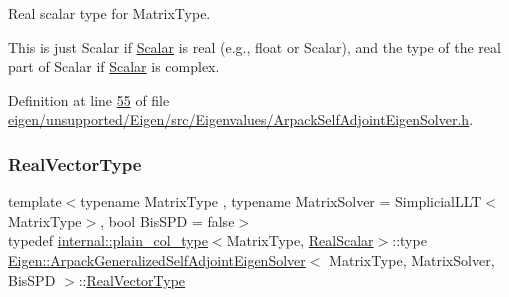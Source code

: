 Real scalar type for {\ttfamily Matrix\+Type}. 

This is just {\ttfamily Scalar} if \hyperlink{class_eigen_1_1_arpack_generalized_self_adjoint_eigen_solver_ab1182405bfe87a505d4b7a8311c661ec}{Scalar} is real (e.\+g., {\ttfamily float} or {\ttfamily Scalar}), and the type of the real part of {\ttfamily Scalar} if \hyperlink{class_eigen_1_1_arpack_generalized_self_adjoint_eigen_solver_ab1182405bfe87a505d4b7a8311c661ec}{Scalar} is complex. 

Definition at line \hyperlink{eigen_2unsupported_2_eigen_2src_2_eigenvalues_2_arpack_self_adjoint_eigen_solver_8h_source_l00055}{55} of file \hyperlink{eigen_2unsupported_2_eigen_2src_2_eigenvalues_2_arpack_self_adjoint_eigen_solver_8h_source}{eigen/unsupported/\+Eigen/src/\+Eigenvalues/\+Arpack\+Self\+Adjoint\+Eigen\+Solver.\+h}.

\mbox{\label{class_eigen_1_1_arpack_generalized_self_adjoint_eigen_solver_a47a5becb6dda25dbd90a1704a8247dd8}} 
\subsubsection{\texorpdfstring{Real\+Vector\+Type}{RealVectorType}\hspace{0.1cm}{\footnotesize\ttfamily [1/2]}}
{\footnotesize\ttfamily template$<$typename Matrix\+Type , typename Matrix\+Solver  = Simplicial\+L\+L\+T$<$\+Matrix\+Type$>$, bool Bis\+S\+PD = false$>$ \\
typedef \hyperlink{struct_eigen_1_1internal_1_1plain__col__type}{internal\+::plain\+\_\+col\+\_\+type}$<$Matrix\+Type, \hyperlink{class_eigen_1_1_arpack_generalized_self_adjoint_eigen_solver_a2555af55e53bf9de894a49e639be2e1e}{Real\+Scalar}$>$\+::type \hyperlink{class_eigen_1_1_arpack_generalized_self_adjoint_eigen_solver}{Eigen\+::\+Arpack\+Generalized\+Self\+Adjoint\+Eigen\+Solver}$<$ Matrix\+Type, Matrix\+Solver, Bis\+S\+PD $>$\+::\hyperlink{class_eigen_1_1_arpack_generalized_self_adjoint_eigen_solver_a47a5becb6dda25dbd90a1704a8247dd8}{Real\+Vector\+Type}}



